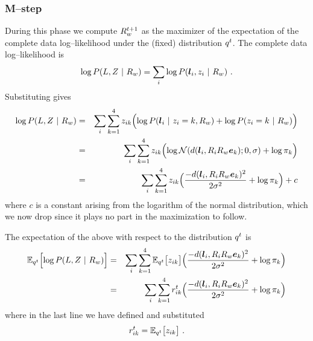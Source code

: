 \subsubsection{M--step}

During this phase we compute $\SceneR^{t+1}$ as the maximizer of the
expectation of the complete data log--likelihood under the (fixed)
distribution $\PosteriorEst^t$. The complete data log--likelihood is
\begin{equation}
  \label{eq:complete-loglikelihood}
  \log P(\LineSegs,\Indicators ~|~ \SceneR) =
  \sum_i \log P(\LineSeg_i,\Indicator_i ~|~ \SceneR) ~.
\end{equation}
Substituting  gives
\begin{eqnarray}
  \log P(\LineSegs,\Indicators ~|~ \SceneR) 
  &=&
  \sum_i \sum_{k=1}^4 \Indicator_{ik} \Bigl(
    \log P(\LineSeg_i ~|~ \Indicator_i=k, \SceneR)
    + \log P(\Indicator_i=k ~|~ \SceneR)
  \Bigr)\\
  &=&
  \sum_i \sum_{k=1}^4 \Indicator_{ik} 
  \Bigl(
    \log \NormalDistr(\dist(\LineSeg_i, \CamR_i\SceneR\ebasis_k);0,\sigma)
    + \log \Mixing_k
  \Bigr)\\
  &=&
  \sum_i \sum_{k=1}^4 \Indicator_{ik} 
  \Bigl(
    \frac{-\dist(\LineSeg_i, \CamR_i\SceneR\ebasis_k)^2}{2\sigma^2}
    + \log \Mixing_k
  \Bigr) + c\\
\end{eqnarray}
where $c$ is a constant arising from the logarithm of the normal
distribution, which we now drop since it plays no part in the
maximization to follow.

The expectation of the above with respect to the distribution
$\PosteriorEst^t$ is
\begin{eqnarray}
  \Expected_{\PosteriorEst^t}\Bigl[
    \log P(\LineSegs,\Indicators ~|~ \SceneR) 
  \Bigr]
  &=&
  \sum_i \sum_{k=1}^4
  \Expected_{\PosteriorEst^t} \bigl[ \Indicator_{ik} \bigr]
  \Bigl(
    \frac{-\dist(\LineSeg_i, \CamR_i\SceneR\ebasis_k)^2}{2\sigma^2}
    + \log \Mixing_k
  \Bigr)\\
  &=&
  \label{eq:expected-lik}
  \sum_i \sum_{k=1}^4
  \Resp_{ik}^t
  \Bigl(
    \frac{-\dist(\LineSeg_i, \CamR_i\SceneR\ebasis_k)^2}{2\sigma^2}
    + \log \Mixing_k
  \Bigr)
\end{eqnarray}
where in the last line we have defined and substituted
\begin{equation}
  \Resp_{ik}^t = 
  \Expected_{\PosteriorEst^t} \bigl[ \Indicator_{ik} \bigr] ~.
\end{equation}


